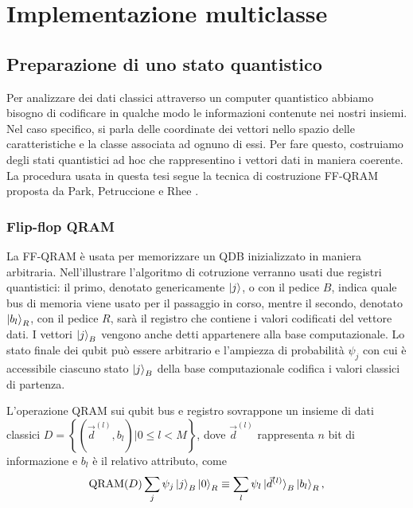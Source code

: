 \chapter{Implementazione multiclasse}\label{ch:implementazione}

\section{Preparazione di uno stato quantistico}

Per analizzare dei dati classici attraverso un computer quantistico 
abbiamo bisogno di codificare in qualche modo le informazioni 
contenute nei nostri insiemi. Nel caso specifico, si parla delle 
coordinate dei vettori nello spazio delle caratteristiche e la 
classe associata ad ognuno di essi. 
Per fare questo, costruiamo degli stati quantistici 
ad hoc che rappresentino i vettori dati in maniera coerente. 
La procedura usata in questa tesi segue la tecnica di costruzione 
\ac{FF-QRAM} proposta da Park, Petruccione e Rhee \cite{petruccione}. 

\subsection{Flip-flop QRAM} \label{sec:ff-qram}

La \ac{FF-QRAM} è usata per memorizzare un \ac{QDB} inizializzato in maniera arbitraria. 
Nell'illustrare l'algoritmo di cotruzione verranno usati due registri quantistici: 
il primo, denotato genericamente $\ket{j}$, o con il pedice $B$, indica quale bus 
di memoria viene usato per il passaggio in corso, mentre il secondo, denotato 
$\ket{b_l}_R$, con il pedice $R$, sarà il registro che contiene i 
valori codificati del vettore dati. 
I vettori $\ket{j}_B$ vengono anche detti appartenere alla base computazionale. 
Lo stato finale dei qubit può essere 
arbitrario e l'ampiezza di probabilità $\psi_j$ con cui è accessibile ciascuno stato 
$\ket{j}_B$ della base computazionale codifica i valori classici di partenza. 

L'operazione QRAM sui qubit bus e registro sovrappone un insieme di dati classici 
$D = \left\{ \left( \vec{d}^{(l)}, b_l \right) | 0 \leq l < M \right\}$, dove 
$\vec{d}^{(l)}$ rappresenta $n$ bit di informazione e $b_l$ è il relativo attributo, come 
\begin{equation} \label{eq:qram}
    \text{QRAM}(D) \sum_j \psi_j \ket{j}_B \ket{0}_R \equiv 
    \sum_l \psi_l \ket{\vec{d}^{(l)}}_B \ket{b_l}_R,
\end{equation}

